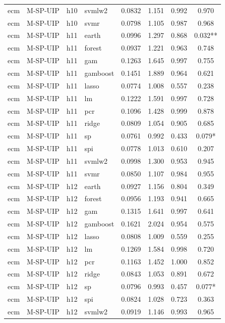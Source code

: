 \begin{ThreePartTable}
\begin{longtable}[t]{llclcccc}
ecm & M-SP-UIP & h10 & svmlw2 & 0.0832 & 1.151 & 0.992 & 0.970\\
ecm & M-SP-UIP & h10 & svmr & 0.0798 & 1.105 & 0.987 & 0.968\\
\addlinespace
ecm & M-SP-UIP & h11 & earth & 0.0996 & 1.297 & 0.868 & 0.032**\\
ecm & M-SP-UIP & h11 & forest & 0.0937 & 1.221 & 0.963 & 0.748\\
ecm & M-SP-UIP & h11 & gam & 0.1263 & 1.645 & 0.997 & 0.755\\
ecm & M-SP-UIP & h11 & gamboost & 0.1451 & 1.889 & 0.964 & 0.621\\
ecm & M-SP-UIP & h11 & lasso & 0.0774 & 1.008 & 0.557 & 0.238\\
ecm & M-SP-UIP & h11 & lm & 0.1222 & 1.591 & 0.997 & 0.728\\
ecm & M-SP-UIP & h11 & pcr & 0.1096 & 1.428 & 0.999 & 0.878\\
ecm & M-SP-UIP & h11 & ridge & 0.0809 & 1.054 & 0.905 & 0.685\\
ecm & M-SP-UIP & h11 & sp & 0.0761 & 0.992 & 0.433 & 0.079*\\
ecm & M-SP-UIP & h11 & spi & 0.0778 & 1.013 & 0.610 & 0.207\\
ecm & M-SP-UIP & h11 & svmlw2 & 0.0998 & 1.300 & 0.953 & 0.945\\
ecm & M-SP-UIP & h11 & svmr & 0.0850 & 1.107 & 0.984 & 0.955\\
\addlinespace
ecm & M-SP-UIP & h12 & earth & 0.0927 & 1.156 & 0.804 & 0.349\\
ecm & M-SP-UIP & h12 & forest & 0.0956 & 1.193 & 0.941 & 0.665\\
ecm & M-SP-UIP & h12 & gam & 0.1315 & 1.641 & 0.997 & 0.641\\
ecm & M-SP-UIP & h12 & gamboost & 0.1621 & 2.024 & 0.954 & 0.575\\
ecm & M-SP-UIP & h12 & lasso & 0.0808 & 1.009 & 0.559 & 0.255\\
ecm & M-SP-UIP & h12 & lm & 0.1269 & 1.584 & 0.998 & 0.720\\
ecm & M-SP-UIP & h12 & pcr & 0.1163 & 1.452 & 1.000 & 0.852\\
ecm & M-SP-UIP & h12 & ridge & 0.0843 & 1.053 & 0.891 & 0.672\\
ecm & M-SP-UIP & h12 & sp & 0.0796 & 0.993 & 0.457 & 0.077*\\
ecm & M-SP-UIP & h12 & spi & 0.0824 & 1.028 & 0.723 & 0.363\\
ecm & M-SP-UIP & h12 & svmlw2 & 0.0919 & 1.146 & 0.993 & 0.965\\

\end{longtable}
\end{ThreePartTable}
